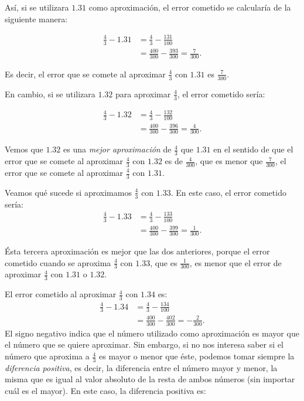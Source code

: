 Así, si se utilizara $1.31$ como aproximación, el error cometido se calcularía de la siguiente
manera:

\begin{align*}
\frac{4}{3} - 1.31 &= \frac{4}{3} - \frac{131}{100} \\
&= \frac{400}{300} - \frac{393}{300} = \frac{7}{300}.
\end{align*}

Es decir, el error que se comete al aproximar $\frac{4}{3}$ con $1.31$ es $\frac{7}{300}$.

En cambio, si se utilizara $1.32$ para aproximar $\frac{4}{3}$, el error cometido sería:

\begin{align*}
\frac{4}{3} - 1.32 &=\frac{4}{3} - \frac{132}{100} \\
&= \frac{400}{300} - \frac{396}{300} = \frac{4}{300}.
\end{align*}

Vemos que $1.32$ es una \emph{mejor aproximación} de $\frac{4}{3}$ que $1.31$ en el sentido de que
el error que se comete al aproximar $\frac{4}{3}$ con $1.32$ es de $\frac{4}{300}$, que es menor
que $\frac{7}{300}$, el error que se comete al aproximar $\frac{4}{3}$ con $1.31$.

Veamos qué sucede si aproximamos $\displaystyle{\frac{4}{3}}$ con $1.33$. En este caso, el error
cometido sería:
\begin{align*}
\frac{4}{3} - 1.33 &=\frac{4}{3} - \frac{133}{100} \\
&= \frac{400}{300} - \frac{399}{300} = \frac{1}{300}.
\end{align*}

Ésta tercera aproximación es mejor que las dos anteriores, porque el error cometido cuando se
aproxima $\frac{4}{3}$ con $1.33$, que es $\frac{1}{300}$, es menor que el error de aproximar
$\frac{4}{3}$ con $1.31$ o $1.32$.

El error cometido al aproximar $\frac{4}{3}$ con $1.34$ es:
\begin{align*}
\frac{4}{3} - 1.34 &=\frac{4}{3} - \frac{134}{100} \\
&= \frac{400}{300} - \frac{402}{300} = -\frac{2}{300}.
\end{align*}
El signo negativo indica que el número utilizado como aproximación es mayor que el número que se
quiere aproximar. Sin embargo, si no nos interesa saber si el número que aproxima a $\frac{4}{3}$
es mayor o menor que éste, podemos tomar siempre la \textit{diferencia positiva}, es decir, la
diferencia entre el número mayor y menor, la misma que es igual al valor absoluto de la resta de
ambos números (sin importar cuál es el mayor). En este caso, la diferencia positiva es:

